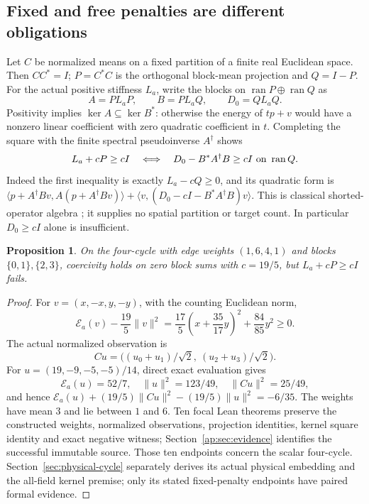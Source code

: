\documentclass[11pt]{article}
\newtheorem{proposition}[theorem]{Proposition}
\newcommand{\E}{\mathcal E}
\begin{document}
\subsection{Fixed and free penalties are different obligations}
Let $C$ be normalized means on a fixed partition of a finite real Euclidean space.
Then $CC^*=I$; $P=C^*C$ is the orthogonal block-mean projection and $Q=I-P$.
For the actual positive stiffness $L_a$, write the blocks on
$\operatorname{ran}P\oplus\operatorname{ran}Q$ as
\[
 A=PL_aP,\qquad B=PL_aQ,\qquad D_0=QL_aQ.
\]
Positivity implies $\ker A\subseteq\ker B^*$: otherwise the energy of $tp+v$
would have a nonzero linear coefficient with zero quadratic coefficient in $t$.
Completing the square with the finite spectral pseudoinverse $A^\dagger$ shows
\begin{equation}\label{ap:eq:shorted}
 L_a+cP\geq cI\quad\Longleftrightarrow\quad
 D_0-B^*A^\dagger B\geq cI\ \hbox{on }\operatorname{ran}Q.
\end{equation}
Indeed the first inequality is exactly $L_a-cQ\geq0$, and its quadratic form is
$\langle p+A^\dagger Bv,A(p+A^\dagger Bv)\rangle+
\langle v,(D_0-cI-B^*A^\dagger B)v\rangle$.
This is classical shorted-operator algebra \cite{ap:anderson}; it supplies no spatial
partition or target count. In particular $D_0\geq cI$ alone is insufficient.

\begin{proposition}\label{ap:prop:formal-cycle}
On the four-cycle with edge weights $(1,6,4,1)$ and blocks $\{0,1\},\{2,3\}$,
coercivity holds on zero block sums with $c=19/5$, but $L_a+cP\geq cI$ fails.
\end{proposition}
\begin{proof}
For $v=(x,-x,y,-y)$, with the counting Euclidean norm,
\[
 \E_a(v)-\frac{19}{5}\|v\|^2
 =\frac{17}{5}\left(x+\frac{35}{17}y\right)^2+\frac{84}{85}y^2\geq0.
\]
The actual normalized observation is
\[
 Cu=\bigl((u_0+u_1)/\sqrt2,\ (u_2+u_3)/\sqrt2\bigr).
\]
For $u=(19,-9,-5,-5)/14$, direct exact evaluation gives
\[
 \E_a(u)=52/7,\quad\|u\|^2=123/49,\quad\|Cu\|^2=25/49,
\]
and hence $\E_a(u)+(19/5)\|Cu\|^2-(19/5)\|u\|^2=-6/35$.
The weights have mean $3$ and lie between $1$ and $6$. Ten focal Lean theorems
preserve the constructed weights, normalized observations, projection identities,
kernel square identity and exact negative witness; Section~\ref{ap:sec:evidence}
identifies the successful immutable source. Those ten endpoints concern the scalar four-cycle. Section~\ref{sec:physical-cycle}
separately derives its actual physical embedding and the all-field kernel
premise; only its stated fixed-penalty endpoints have paired formal evidence.
\end{proof}
\end{document}
